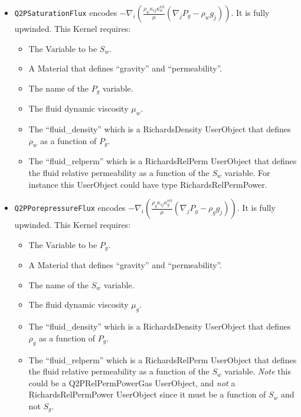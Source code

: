 \documentclass[]{scrreprt}
\begin{document}
\begin{itemize}
\item {\tt Q2PSaturationFlux} encodes $ - \nabla_{i}
\left( \frac{\rho_{w} \kappa_{ij}\kappa_{w}^{\mathrm{rel}}}{\mu}
(\nabla_{j}P_{g} - \rho_{w} g_{j}) \right)$.  It is fully upwinded.
This Kernel requires:
\begin{itemize}
\item The Variable to be $S_{w}$.
\item A Material that defines ``gravity'' and ``permeability''.
\item The name of the $P_{g}$ variable.
\item The fluid dynamic viscosity $\mu_{w}$.
\item The ``fluid\_density'' which is a RichardsDensity
  UserObject that defines $\rho_{w}$ as a function of $P_{g}$.
\item The ``fluid\_relperm'' which is a RichardsRelPerm UserObject that
  defines the fluid relative permeability as a function of the $S_{w}$
  variable.  For instance this UserObject could have type
  RichardsRelPermPower.
\end{itemize}

\item {\tt Q2PPorepressureFlux} encodes $ - \nabla_{i}
\left( \frac{\rho_{g} \kappa_{ij}\kappa_{g}^{\mathrm{rel}}}{\mu}
(\nabla_{j}P_{g} - \rho_{g} g_{j}) \right)$.  It is fully upwinded.
This Kernel requires:
\begin{itemize}
\item The Variable to be $P_{g}$.
\item A Material that defines ``gravity'' and ``permeability''.
\item The name of the $S_{w}$ variable.
\item The fluid dynamic viscosity $\mu_{g}$.
\item The ``fluid\_density'' which is a RichardsDensity
  UserObject that defines $\rho_{g}$ as a function of $P_{g}$.
\item The ``fluid\_relperm'' which is a RichardsRelPerm UserObject that
  defines the fluid relative permeability as a function of the $S_{w}$
  variable.  {\em Note} this could be a Q2PRelPermPowerGas UserObject,
  and {\em not} a RichardsRelPermPower UserObject since it must be a
  function of $S_{w}$ and {\em} not $S_{g}$.
\end{itemize}


\end{itemize}
\end{document}
